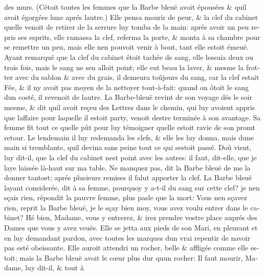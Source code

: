 \documentclass[14pt,a4paper]{memoir}
\begin{document}
{{\begin{otherlanguage}{french}
des murs. (C\textquotesingle étoit toutes les femmes que la Barbe bleuë
avoit épousées \& qu\textquotesingle il avoit égorgées
l\textquotesingle une aprés l\textquotesingle autre.) Elle pensa mourir
de peur, \& la clef du cabinet qu\textquotesingle elle venoit de retirer
de la serrure luy tomba de la main: aprés avoir un peu repris ses
esprits, elle ramassa la clef, referma la porte, \& monta à sa chambre
pour se remettre un peu, mais elle n\textquotesingle en pouvoit venir à
bout, tant elle estoit émeuë. Ayant remarqué que la clef du cabinet
étoit tachée de sang, elle l\textquotesingle essuia deux ou trois fois,
mais le sang ne s\textquotesingle en alloit point; elle eut beau la
laver, \& mesme la frotter avec du sablon \& avec du grais, il demeura
toûjours du sang, car la clef estait Fée, \& il n\textquotesingle y
avoit pas moyen de la nettoyer tout-à-fait: quand on ôtoit le sang
d\textquotesingle un costé, il revenoit de l\textquotesingle autre. La
Barbe-bleuë revint de son voyage dés le soir mesme, \& dit
qu\textquotesingle il avoit reçeu des Lettres dans le chemin, qui luy
avoient appris que l\textquotesingle affaire pour laquelle il estoit
party, venoit d\textquotesingle estre terminée à son avantage. Sa femme
fit tout ce qu\textquotesingle elle pût pour luy témoigner
qu\textquotesingle elle estoit ravie de son promt retour. Le lendemain
il luy redemanda les clefs, \& elle les luy donna, mais
d\textquotesingle une main si tremblante, qu\textquotesingle il devina
sans peine tout ce qui s\textquotesingle estoit passé.
D\textquotesingle où vient, luy dit-il, que la clef du cabinet
n\textquotesingle est point avec les autres: il faut, dit-elle, que je
l\textquotesingle aye laissée là-haut sur ma table. Ne manquez pas, dit
la Barbe bleuë de me la donner tantost; aprés plusieurs remises il falut
apporter la clef. La Barbe bleuë l\textquotesingle ayant considerée, dit
à sa femme, pourquoy y a-t-il du sang sur cette clef? je
n\textquotesingle en sçais rien, répondit la pauvre femme, plus pasle
que la mort: Vous n\textquotesingle en sçavez rien, reprit la Barbe
bleuë, je le sçay bien moy, vous avez voulu entrer dans le cabinet? Hé
bien, Madame, vous y entrerez, \& irez prendre vostre place auprés des
Dames que vous y avez veuës. Elle se jetta aux pieds de son Mari, en
pleurant et en luy demandant pardon, avec toutes les marques
d\textquotesingle un vrai repentir de n\textquotesingle avoir pas esté
obeissante. Elle auroit attendri un rocher, belle \& affligée comme elle
estoit; mais la Barbe bleuë avoit le cœur plus dur qu\textquotesingle un
rocher: Il faut mourir, Madame, luy dit-il, \& tout à

\end{otherlanguage}}}
\end{document}
